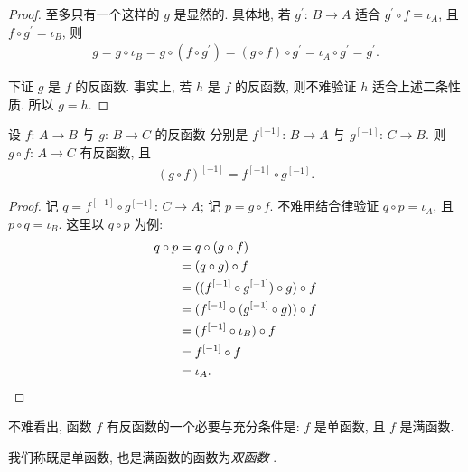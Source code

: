 \begin{proof}
    至多只有一个这样的 $g$ 是显然的.
    具体地, 若
    $g^{\prime}$: $B \to A$
    适合
    $g^{\prime} \circ f = \iota_A$,
    且 $f \circ g^{\prime} = \iota_B$, 则
    \begin{align*}
        g
        = g \circ \iota_B
        = g \circ (f \circ g^{\prime})
        = (g \circ f) \circ g^{\prime}
        = \iota_A \circ g^{\prime}
        = g^{\prime}.
    \end{align*}

    下证 $g$ 是 $f$ 的反函数.
    事实上, 若 $h$ 是 $f$ 的反函数,
    则不难验证 $h$ 适合上述二条性质.
    所以 $g = h$.
\end{proof}

\begin{theorem}
    设 $f$: $A \to B$ 与 $g$: $B \to C$ 的反函数%
    分别是 $f^{[-1]}$: $B \to A$ 与 $g^{[-1]}$: $C \to B$.
    则 $g \circ f$: $A \to C$ 有反函数, 且
    \begin{align*}
        {(g \circ f)}^{[-1]} = f^{[-1]} \circ g^{[-1]}.
    \end{align*}
\end{theorem}

\begin{proof}
    记 $q = f^{[-1]} \circ g^{[-1]}$: $C \to A$;
    记 $p = g \circ f$.
    不难用结合律验证 $q \circ p = \iota_A$,
    且 $p \circ q = \iota_B$.
    这里以 $q \circ p$ 为例:
    \begin{align*}
        q \circ p
        = {} & q \circ (g \circ f)                         \\
        = {} & (q \circ g) \circ f                         \\
        = {} & ((f^{[-1]} \circ g^{[-1]}) \circ g) \circ f \\
        = {} & (f^{[-1]} \circ (g^{[-1]} \circ g)) \circ f \\
        = {} & (f^{[-1]} \circ \iota_B) \circ f            \\
        = {} & f^{[-1]} \circ f                            \\
        = {} & \iota_A. \qedhere
    \end{align*}
\end{proof}

\begin{remark}
    不难看出, 函数 $f$ 有反函数的一个必要与充分条件是:
    $f$ 是单函数, 且 $f$ 是满函数.

    我们称既是单函数, 也是满函数的函数为\emph{双函数}%
    .
\end{remark}

